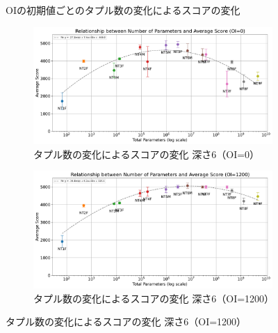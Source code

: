 \begin{figure}[t]
    \caption{OIの初期値ごとのタプル数の変化によるスコアの変化}
    \label{fig:score_vs_tuple_all}
\end{figure}

\begin{figure}[t]
    \centering
    \begin{subfigure}[b]{\linewidth}
        \centering
        \includegraphics[width=\linewidth]{pdf/parameter_performance_plots/params_performance_OI0_EXP6.pdf}
        \caption{タプル数の変化によるスコアの変化 深さ6（OI=0）}
        \label{fig:score_vs_tuple_OI0_EXP6}
    \end{subfigure}

    \vspace{1em}
    \begin{subfigure}[b]{\linewidth}
        \centering
        \includegraphics[width=\linewidth]{pdf/parameter_performance_plots/params_performance_OI1200_EXP6.pdf}
        \caption{タプル数の変化によるスコアの変化 深さ6（OI=1200）}
        \label{fig:score_vs_tuple_OI1200_EXP6}
    \end{subfigure}


\end{figure}
